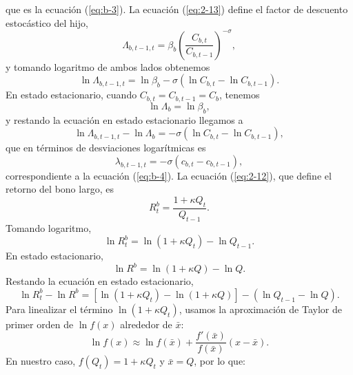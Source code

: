 \documentclass[../../entrega.tex]{subfiles}
\begin{document}
que es la ecuación (\ref{eq:b-3}).
La ecuación (\ref{eq:2-13}) define el factor de descuento estocástico del hijo,
\begin{equation*}
    \Lambda_{b,t-1,t} = \beta_b \left(\frac{C_{b,t}}{C_{b,t-1}}\right)^{-\sigma},
\end{equation*}
y tomando logaritmo de ambos lados obtenemos
\begin{equation*}
    \ln \Lambda_{b,t-1,t} = \ln \beta_b - \sigma(\ln C_{b,t} - \ln C_{b,t-1}).
\end{equation*}
En estado estacionario, cuando $C_{b,t} = C_{b,t-1} = C_b$, tenemos
\begin{equation*}
    \ln \Lambda_b = \ln \beta_b,
\end{equation*}
y restando la ecuación en estado estacionario llegamos a
\begin{equation*}
    \ln \Lambda_{b,t-1,t} - \ln \Lambda_b = -\sigma(\ln C_{b,t} - \ln C_{b,t-1}),
\end{equation*}
que en términos de desviaciones logarítmicas es
\begin{equation*}
    \lambda_{b,t-1,t} = -\sigma(c_{b,t} - c_{b,t-1}),
\end{equation*}
correspondiente a la ecuación (\ref{eq:b-4}).
La ecuación (\ref{eq:2-12}), que define el retorno del bono largo, es
\begin{equation*}
    R_t^b = \frac{1 + \kappa Q_t}{Q_{t-1}}.
\end{equation*}
Tomando logaritmo,
\begin{equation*}
    \ln R_t^b = \ln(1 + \kappa Q_t) - \ln Q_{t-1}.
\end{equation*}
En estado estacionario,
\begin{equation*}
    \ln R^b = \ln(1 + \kappa Q) - \ln Q.
\end{equation*}
Restando la ecuación en estado estacionario,
\begin{equation*}
    \ln R_t^b - \ln R^b = [\ln(1 + \kappa Q_t) - \ln(1 + \kappa Q)] - (\ln Q_{t-1} - \ln Q).
\end{equation*}
Para linealizar el término $\ln(1 + \kappa Q_t)$, usamos la aproximación de Taylor de primer orden de $\ln f(x)$ alrededor de $\bar{x}$:
\begin{equation*}
    \ln f(x) \approx \ln f(\bar{x}) + \frac{f'(\bar{x})}{f(\bar{x})}(x - \bar{x}).
\end{equation*}
En nuestro caso, $f(Q_t) = 1 + \kappa Q_t$ y $\bar{x} = Q$, por lo que:
\end{document}
